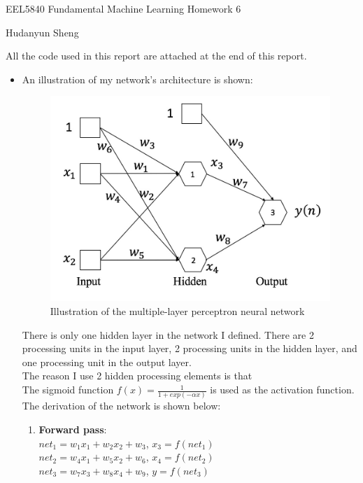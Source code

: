 \documentclass[a4paper]{article}
\begin{document}
\begin{spacing}{2.0}
\begin{flushleft}\begin{huge}EEL5840 Fundamental Machine Learning   Homework 6\end{huge}\end{flushleft}
\begin{flushright}\begin{Large} Hudanyun Sheng \end{Large}\end{flushright}

\Large{All the code used in this report are attached at the end of this report.}
\normalsize
\begin{itemize}

\item An illustration of my network's architecture is shown:
\begin{figure}[H]
\centering
\includegraphics[width = 5in]{flowchart.png}
\caption{Illustration of the multiple-layer perceptron neural network}
\label{flowchart}
\end{figure}
There is only one hidden layer in the network I defined. There are 2 processing units in the input layer, 2 processing units in the hidden layer, and one processing unit in the output layer.\\
The reason I use 2 hidden processing elements is that \\
The sigmoid function $f(x) = \displaystyle\frac{1}{1+exp(-\alpha x)}$ is used as the activation function. The derivation of the network is shown below:

\begin{enumerate}
\item \textbf{Forward pass}:\\
$net_1 = w_1x_1+ w_2x_2+w_3$, $x_3 = f(net_1)$\\
$net_2 = w_4x_1+ w_5x_2+w_6$, $x_4 = f(net_2)$\\
$net_3 = w_7x_3+ w_8x_4+w_9$, $y = f(net_3)$


\end{enumerate}
\end{itemize}
\end{spacing}
\end{document}
